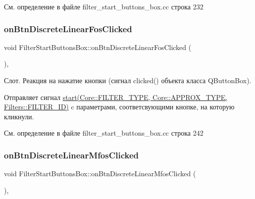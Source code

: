См. определение в файле filter\+\_\+start\+\_\+buttons\+\_\+box.\+cc строка 232

\hypertarget{class_filter_start_buttons_box_abca20b7c058a4305904912a8e9ea87db}{}\label{class_filter_start_buttons_box_abca20b7c058a4305904912a8e9ea87db} 
\subsubsection{\texorpdfstring{on\+Btn\+Discrete\+Linear\+Fos\+Clicked}{onBtnDiscreteLinearFosClicked}}
{\footnotesize\ttfamily void Filter\+Start\+Buttons\+Box\+::on\+Btn\+Discrete\+Linear\+Fos\+Clicked (\begin{DoxyParamCaption}{ }\end{DoxyParamCaption})\hspace{0.3cm}{\ttfamily [private]}, {\ttfamily [slot]}}

Слот. Реакция на нажатие кнопки (сигнал clicked() объекта класса Q\+Button\+Box).

Отправляет сигнал \hyperlink{class_filter_start_buttons_box_ac6e2a6555f1d388391f188f834b8e753}{start(\+Core\+::\+F\+I\+L\+T\+E\+R\+\_\+\+T\+Y\+P\+E, Core\+::\+A\+P\+P\+R\+O\+X\+\_\+\+T\+Y\+P\+E, Filters\+::\+F\+I\+L\+T\+E\+R\+\_\+\+I\+D)} c параметрами, соответсвующими кнопке, на которую кликнули. 

См. определение в файле filter\+\_\+start\+\_\+buttons\+\_\+box.\+cc строка 242

\hypertarget{class_filter_start_buttons_box_ac200f7d204677620288463458a0d5dea}{}\label{class_filter_start_buttons_box_ac200f7d204677620288463458a0d5dea} 
\subsubsection{\texorpdfstring{on\+Btn\+Discrete\+Linear\+Mfos\+Clicked}{onBtnDiscreteLinearMfosClicked}}
{\footnotesize\ttfamily void Filter\+Start\+Buttons\+Box\+::on\+Btn\+Discrete\+Linear\+Mfos\+Clicked (\begin{DoxyParamCaption}{ }\end{DoxyParamCaption})\hspace{0.3cm}{\ttfamily [private]}, {\ttfamily [slot]}}

